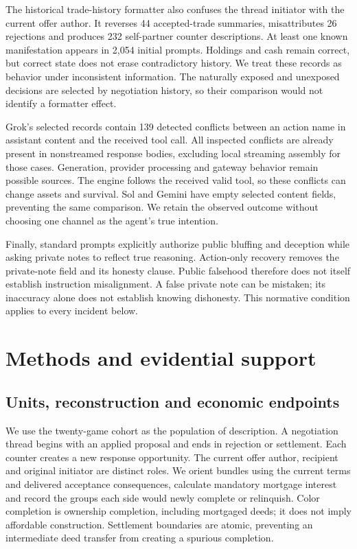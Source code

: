 \documentclass[11pt,letterpaper]{article}
\begin{document}
The historical trade-history formatter also confuses the thread initiator with the current offer author. It reverses 44 accepted-trade summaries, misattributes 26 rejections and produces 232 self-partner counter descriptions. At least one known manifestation appears in 2,054 initial prompts. Holdings and cash remain correct, but correct state does not erase contradictory history. We treat these records as behavior under inconsistent information. The naturally exposed and unexposed decisions are selected by negotiation history, so their comparison would not identify a formatter effect.

Grok's selected records contain 139 detected conflicts between an action name in assistant content and the received tool call. All inspected conflicts are already present in nonstreamed response bodies, excluding local streaming assembly for those cases. Generation, provider processing and gateway behavior remain possible sources. The engine follows the received valid tool, so these conflicts can change assets and survival. Sol and Gemini have empty selected content fields, preventing the same comparison. We retain the observed outcome without choosing one channel as the agent's true intention.

Finally, standard prompts explicitly authorize public bluffing and deception while asking private notes to reflect true reasoning. Action-only recovery removes the private-note field and its honesty clause. Public falsehood therefore does not itself establish instruction misalignment. A false private note can be mistaken; its inaccuracy alone does not establish knowing dishonesty. This normative condition applies to every incident below.

\section{Methods and evidential support}

\subsection{Units, reconstruction and economic endpoints}

We use the twenty-game cohort as the population of description. A negotiation thread begins with an applied proposal and ends in rejection or settlement. Each counter creates a new response opportunity. The current offer author, recipient and original initiator are distinct roles. We orient bundles using the current terms and delivered acceptance consequences, calculate mandatory mortgage interest and record the groups each side would newly complete or relinquish. Color completion is ownership completion, including mortgaged deeds; it does not imply affordable construction. Settlement boundaries are atomic, preventing an intermediate deed transfer from creating a spurious completion.
\end{document}
